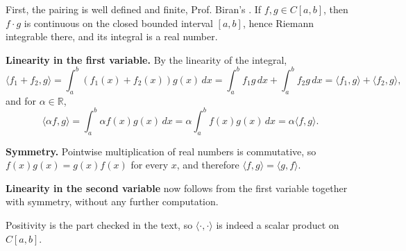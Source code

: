 \begin{exercisesolution}
\label{sol:integral_pairing}
  First, the pairing is well defined and finite, Prof. Biran's . If $f, g \in C[a,b]$, then $f \cdot g$ is continuous on the closed bounded interval $[a,b]$, hence Riemann integrable there, and its integral is a real number.

  \textbf{Linearity in the first variable.} By the linearity of the integral,
  \[ \langle f_1 + f_2, g \rangle = \int_a^b \left( f_1(x) + f_2(x) \right) g(x) \, dx = \int_a^b f_1 g \, dx + \int_a^b f_2 g \, dx = \langle f_1, g \rangle + \langle f_2, g \rangle, \]
  and for $\alpha \in \mathbb{R}$,
  \[ \langle \alpha f, g \rangle = \int_a^b \alpha f(x) g(x) \, dx = \alpha \int_a^b f(x) g(x) \, dx = \alpha \langle f, g \rangle. \]

  \textbf{Symmetry.} Pointwise multiplication of real numbers is commutative, so $f(x)g(x) = g(x)f(x)$ for every $x$, and therefore $\langle f, g \rangle = \langle g, f \rangle$.

  \textbf{Linearity in the second variable} now follows from the first variable together with symmetry, without any further computation.

  Positivity is the part checked in the text, so $\langle \cdot, \cdot \rangle$ is indeed a scalar product on $C[a,b]$.
\end{exercisesolution}

